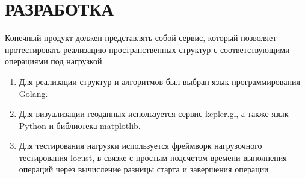 \chapter{РАЗРАБОТКА}
\label{cha:development}

Конечный продукт должен представлять собой сервис, который позволяет протестировать реализацию пространственных структур с соответствующими операциями под нагрузкой. 
\begin{enumerate}
    \item Для реализации структур и алгоритмов был выбран язык программирования Golang.  
    \item Для визуализации геоданных используется сервис \href{https://kepler.gl/}{kepler.gl}, а также язык Python и библиотека matplotlib.
    \item Для тестирования нагрузки используется фреймворк нагрузочного тестирования \href{https://locust.io/}{locust}, в связке с простым подсчетом времени выполнения операций через вычисление разницы старта и завершения операции. 
\end{enumerate}
